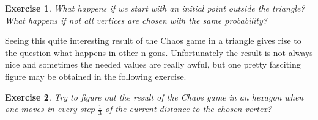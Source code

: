 \documentclass[11pt,a5paper]{article}
\newtheorem{exercise}{Exercise}
\begin{document}
\begin{exercise}
What happens if we start with an initial point outside the triangle? What happens if not all vertices are chosen with the same probability?
\end{exercise}

\noindent Seeing this quite interesting result of the Chaos game in a triangle gives rise to the question what happens in other n-gons. Unfortunately the result is not always nice and sometimes the needed values are really awful, but one pretty fasciting figure may be obtained in the following exercise.\\

\begin{exercise}
Try to figure out the result of the Chaos game in an hexagon when one moves in every step $\frac{1}{3}$ of the current distance to the chosen vertex?
\end{exercise}
\end{document}
